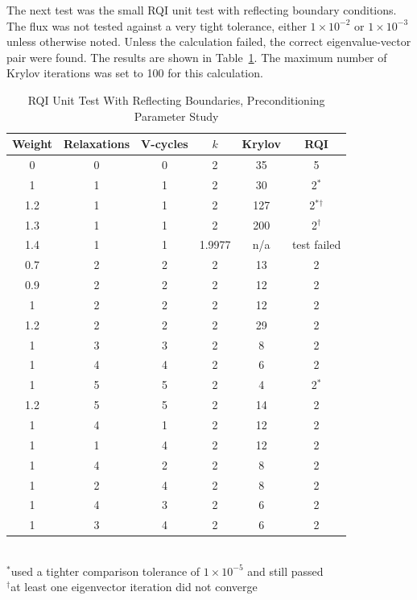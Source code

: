 The next test was the small RQI unit test with reflecting boundary conditions. The flux was not tested against a very tight tolerance, either $1 \times 10^{-2}$ or $1 \times 10^{-3}$ unless otherwise noted. Unless the calculation failed, the correct eigenvalue-vector pair were found. The results are shown in Table~\ref{table:RQIUnitTestRefl}. The maximum number of Krylov iterations was set to 100 for this calculation.
%
\begin{table}[!h]
\caption{RQI Unit Test With Reflecting Boundaries, Preconditioning Parameter Study}
\begin{center}
\begin{tabular}{c c c c c c}
\hline
Weight & Relaxations & V-cycles & $k$ & Krylov & RQI \\[0.5ex]
\hline
0    & 0 & 0 & 2 & 35   & 5 \\
1    & 1 & 1 & 2 & 30   & 2$^{*}$ \\
1.2 & 1 & 1 & 2 & 127 & 2$^{*}$$^{\dag}$ \\
1.3 & 1 & 1 & 2 & 200 & 2$^{\dag}$ \\
1.4 & 1 & 1 & 1.9977  & n/a & test failed \\
\hline
0.7 & 2 & 2 & 2 & 13   & 2 \\
0.9 & 2 & 2 & 2 & 12   & 2 \\
1    & 2 & 2 & 2 & 12   & 2 \\
1.2 & 2 & 2 & 2 & 29   & 2 \\
\hline
1    & 3 & 3 & 2 & 8     & 2 \\
1    & 4 & 4 & 2 & 6     & 2 \\
1    & 5 & 5 & 2 & 4     & 2$^{*}$ \\
1.2 & 5 & 5 & 2 & 14   & 2 \\
\hline
1    & 4 & 1 & 2 & 12   & 2 \\
1    & 1 & 4 & 2 & 12   & 2 \\
1    & 4 & 2 & 2 & 8     & 2 \\
1    & 2 & 4 & 2 & 8     & 2 \\
1    & 4 & 3 & 2 & 6     & 2 \\
1    & 3 & 4 & 2 & 6     & 2 \\
\hline 
\end{tabular}\\
$^{*}$used a tighter comparison tolerance of $1 \times 10^{-5}$ and still passed\\
$^{\dag}$at least one eigenvector iteration did not converge
\end{center}
\label{table:RQIUnitTestRefl}
\end{table}

